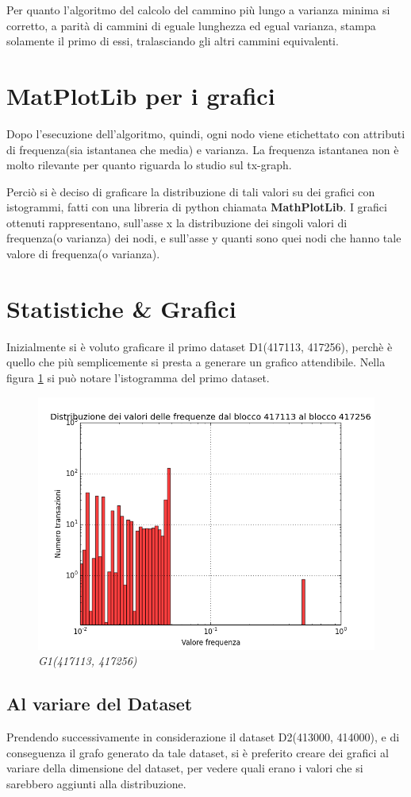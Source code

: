 Per quanto l'algoritmo del calcolo del cammino più lungo a varianza minima si corretto, a parità di cammini di eguale lunghezza ed egual varianza, stampa solamente il primo di essi, tralasciando gli altri cammini equivalenti.

\section{MatPlotLib per i grafici}
Dopo l'esecuzione dell'algoritmo, quindi, ogni nodo viene etichettato con attributi di frequenza(sia istantanea che media) e varianza. La frequenza istantanea non è molto rilevante per quanto riguarda lo studio sul tx-graph. 

Perciò si è deciso di graficare la distribuzione di tali valori su dei grafici con istogrammi, fatti con una libreria di python chiamata \textbf{MathPlotLib}. I grafici ottenuti rappresentano, sull'asse x la distribuzione dei singoli valori di frequenza(o varianza) dei nodi, e sull'asse y quanti sono quei nodi che hanno tale valore di frequenza(o varianza).

\section{Statistiche \& Grafici}
Inizialmente si è voluto graficare il primo dataset D1(417113, 417256), perchè è quello che più semplicemente si presta a generare un grafico attendibile. Nella figura \ref{fig:histg1} si può notare l'istogramma del primo dataset.
\begin{figure}[htbp]
	\centering
	\includegraphics[width = 0.8\linewidth]{figure/histg1}
	\caption{\textit{G1(417113, 417256)}\label{fig:histg1}}
\end{figure}
\newpage
\subsection{Al variare del Dataset}
Prendendo successivamente in considerazione il dataset D2(413000, 414000), e di conseguenza il grafo generato da tale dataset, si è preferito creare dei grafici al variare della dimensione del dataset, per vedere quali erano i valori che si sarebbero aggiunti alla distribuzione.

